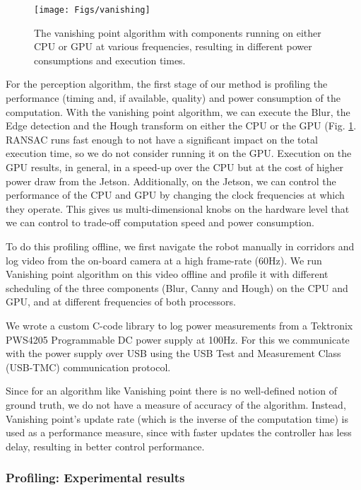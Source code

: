 \begin{figure}
	\centering
	\texttt{[image: Figs/vanishing]}
	\caption{The vanishing point algorithm with components running on either CPU or GPU at various frequencies, resulting in different power consumptions and execution times.}
	\label{fig:vanishing}		
\end{figure}

For the perception algorithm, the first stage of our method is profiling the performance (timing and, if available, quality) and power consumption of the computation. With the vanishing point algorithm, we can execute the Blur, the Edge detection and the Hough transform on either the CPU or the GPU (Fig. \ref{fig:vanishing}. RANSAC runs fast enough to not have a significant impact on the total execution time, so we do not consider running it on the GPU. Execution on the GPU results, in general, in a speed-up over the CPU but at the cost of higher power draw from the Jetson. Additionally, on the Jetson, we can control the performance of the CPU and GPU by changing the clock frequencies at which they operate. This gives us multi-dimensional knobs on the hardware level that we can control to trade-off computation speed and power consumption.

To do this profiling offline, we first navigate the robot manually in corridors and log video from the on-board camera at a high frame-rate (60Hz). 
We run Vanishing point algorithm on this video offline and profile it with different scheduling of the three components (Blur, Canny and Hough) on the CPU and GPU, and at different frequencies of both processors.

We wrote a custom C-code library to log power measurements from a Tektronix PWS4205 Programmable DC power supply at 100Hz. 
For this we communicate with the power supply over USB using the USB Test and Measurement Class (USB-TMC) communication protocol. 
 
Since for an algorithm like Vanishing point there is no well-defined notion of ground truth, we do not have a measure of accuracy of the algorithm. 
Instead, Vanishing point's update rate (which is the inverse of the computation time) is used as a performance measure, since with faster updates the controller has less delay, resulting in better control performance. 

\subsubsection{Profiling: Experimental results}

